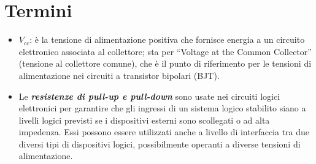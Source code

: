 \documentclass[
]{book}
\providecommand{\tightlist}{%
  \setlength{\itemsep}{0pt}\setlength{\parskip}{0pt}}
\begin{document}
\section{Termini}\label{termini}

\begin{itemize}
\tightlist
\item
  \(V_{cc}\): è la tensione di alimentazione positiva che fornisce
  energia a un circuito elettronico associata al collettore; sta per
  ``Voltage at the Common Collector'' (tensione al collettore comune),
  che è il punto di riferimento per le tensioni di alimentazione nei
  circuiti a transistor bipolari (BJT).
\item
  Le \textbf{\emph{resistenze di pull-up e pull-down}} sono usate nei
  circuiti logici elettronici per garantire che gli ingressi di un
  sistema logico stabilito siano a livelli logici previsti se i
  dispositivi esterni sono scollegati o ad alta impedenza. Essi possono
  essere utilizzati anche a livello di interfaccia tra due diversi tipi
  di dispositivi logici, possibilmente operanti a diverse tensioni di
  alimentazione.

  \begin{table}[H]
    \centering
    \caption{Tabella di comportamento del segnale dell'interruttore con vari resistori}
  \end{table}
\end{itemize}

\backmatter
\end{document}
